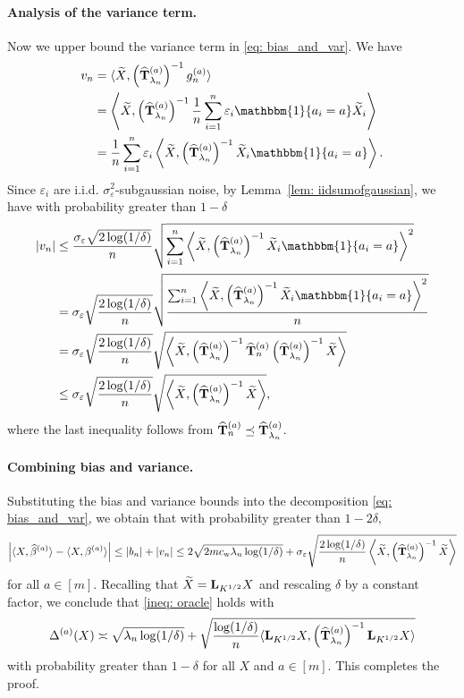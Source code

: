 \documentclass[mnsc]{informs3aa} %
\newcommand{\abs}[1]{\left|#1\right|}
\renewcommand{\hat}{\widehat}
\renewcommand{\tilde}{\widetilde}
\newcommand{\bL}{\bold L}
\renewcommand{\hat}{\widehat}
\renewcommand{\tilde}{\widetilde}
\newcommand{\indi}{\mathbbm{1}}
\renewcommand{\hat}{\widehat}
\renewcommand{\tilde}{\widetilde}
\begin{document}
\paragraph{Analysis of the variance term.}Now we upper bound the variance term in \eqref{eq: bias_and_var}. We have
\begin{align}
	v_n &= \langle \tilde X,\left(\hatTlamba\right)^{-1}g_n^{(a)}\rangle\nonumber\\
	&=\left\langle \tilde X,\left(\hatTlamba\right)^{-1}\frac{1}{n}\sum_{i=1}^n \varepsilon_i\indi\{a_i=a\}\tilde X_i\right\rangle\nonumber\\
	&=\frac{1}{n} \sum_{i=1}^n \varepsilon_i \left\langle \tilde X, \left(\hatTlamba\right)^{-1}\tilde X_i\indi\{a_i=a\}\right\rangle.\label{eq: var_1}
\end{align}
Since $\varepsilon_i$ are i.i.d. $\sigma_{\varepsilon}^2$-subgaussian noise, by Lemma~\ref{lem: iidsumofgaussian}, we have with probability greater than $1-\delta$
\begin{align*}
	|v_n|&\leq \frac{\sigma_\varepsilon\sqrt{2\log(1/\delta)}}{n}\sqrt{\sum_{i=1}^n \left\langle \tilde X, \left(\hatTlamba\right)^{-1}\tilde X_i\indi\{a_i=a\}\right\rangle^2}\\
	&=\sigma_\varepsilon\sqrt{\frac{2\log(1/\delta)}{n}}\sqrt{\frac{\sum_{i=1}^n \left\langle \tilde X, \left(\hatTlamba\right)^{-1}\tilde X_i\indi\{a_i=a\}\right\rangle^2}{n}}\\
	&=\sigma_\varepsilon\sqrt{\frac{2\log(1/\delta)}{n}}\sqrt{\left\langle \tilde X, \left(\hatTlamba\right)^{-1}\hatT\left(\hatTlamba\right)^{-1}\tilde X\right\rangle}\\
	&\leq \sigma_\varepsilon\sqrt{\frac{2\log(1/\delta)}{n}}\sqrt{\left\langle \tilde X, \left(\hatTlamba\right)^{-1}\tilde X\right\rangle},
\end{align*}
where the last inequality follows from $\hatT\preceq\hatTlamba$.

\paragraph{Combining bias and variance.} Substituting the bias and variance bounds into the decomposition \eqref{eq: bias_and_var}, we obtain that with probability greater than $1-2\delta,$
\[\abs{\langle X,\hat\beta^{(a)}\rangle-\langle X,\beta^{(a)}\rangle} \leq |b_n|+|v_n| \leq 2\sqrt{2mc_{\mathrm{w}}\lambda_n\log(1/\delta)}+\sigma_\varepsilon\sqrt{\frac{2\log(1/\delta)}{n}\left\langle \tilde X, \left(\hatTlamba\right)^{-1}\tilde X\right\rangle}\]
for all $a\in[m].$ Recalling that $\tilde X=\bL_{K^{1/2}}X$ and rescaling $\delta$ by a constant factor, we conclude that \eqref{ineq: oracle} holds with
	\[\Delta^{(a)}(X)\asymp \sqrt{\lambda_n\log(1/\delta) }+\sqrt{\frac{\log (1/\delta)}{n}\langle \bL_{K^{1/2}}X,
\left(	\hatTlamba\right)^{-1}\bL_{K^{1/2}}X\rangle}\]
with probability greater than $1-\delta$ for all $X$ and $a\in[m].$ This completes the proof.
\end{document}
